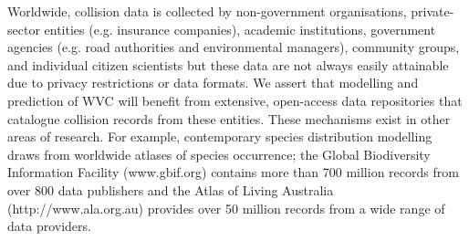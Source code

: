 
Worldwide, collision data is collected by non-government organisations, private-sector entities (e.g. insurance companies), academic institutions, government agencies (e.g. road authorities and environmental managers), community groups, and individual citizen scientists but these data are not always easily attainable due to privacy restrictions or data formats. We assert that modelling and prediction of WVC will benefit from extensive, open-access data repositories that catalogue collision records from these entities. These mechanisms exist in other areas of research. For example, contemporary species distribution modelling draws from worldwide atlases of species occurrence; the Global Biodiversity Information Facility (www.gbif.org) contains more than 700 million records from over 800 data publishers and the Atlas of Living Australia (http://www.ala.org.au) provides over 50 million records from a wide range of data providers.


